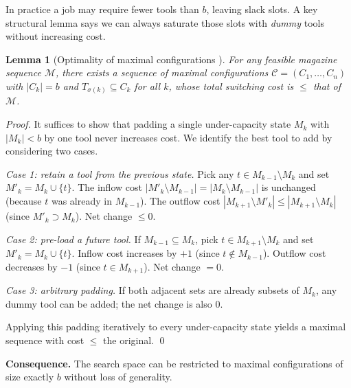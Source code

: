 \documentclass[11pt,a4paper]{article}
\theoremstyle{plain}
\newtheorem{lemma}[theorem]{Lemma}
\theoremstyle{definition}
\begin{document}
In practice a job may require fewer tools than $b$, leaving slack slots. A key
structural lemma says we can always saturate those slots with \emph{dummy} tools
without increasing cost.

\begin{thmbox}
\begin{lemma}[Optimality of maximal configurations \cite{Tang1988}]
\label{lem:maximal}
For any feasible magazine sequence $\mathcal{M}$, there exists a sequence of
\emph{maximal} configurations $\mathcal{C} = (C_1,\ldots,C_n)$ with $|C_k|=b$
and $T_{\sigma(k)} \subseteq C_k$ for all $k$, whose total switching cost is
$\le$ that of $\mathcal{M}$.
\end{lemma}
\end{thmbox}

\begin{proofbox}
\begin{proof}
It suffices to show that padding a single under-capacity state $M_k$ with
$|M_k| < b$ by one tool never increases cost.
We identify the best tool to add by considering two cases.

\medskip\noindent\textit{Case 1: retain a tool from the previous state.}
Pick any $t \in M_{k-1} \setminus M_k$ and set $M'_k = M_k \cup \{t\}$.
The inflow cost $|M'_k \setminus M_{k-1}| = |M_k \setminus M_{k-1}|$ is unchanged
(because $t$ was already in $M_{k-1}$).
The outflow cost $|M_{k+1} \setminus M'_k| \le |M_{k+1} \setminus M_k|$
(since $M'_k \supset M_k$).
Net change $\le 0$.

\medskip\noindent\textit{Case 2: pre-load a future tool.}
If $M_{k-1} \subseteq M_k$, pick $t \in M_{k+1} \setminus M_k$ and set
$M'_k = M_k \cup \{t\}$.
Inflow cost increases by $+1$ (since $t \notin M_{k-1}$).
Outflow cost decreases by $-1$ (since $t \in M_{k+1}$). Net change $= 0$.

\medskip\noindent\textit{Case 3: arbitrary padding.}
If both adjacent sets are already subsets of $M_k$, any dummy tool can be added;
the net change is also $0$.

Applying this padding iteratively to every under-capacity state yields a maximal
sequence with cost $\le$ the original. \qed
\end{proof}
\end{proofbox}

\noindent\textbf{Consequence.} The search space can be restricted to
maximal configurations of size exactly $b$ without loss of generality.

\end{document}
